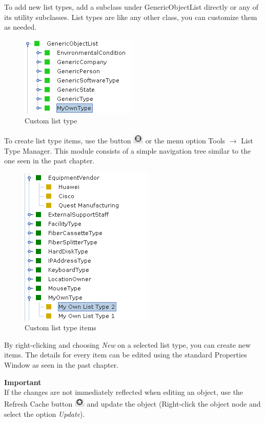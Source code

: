 \documentclass[a4paper]{article}
\begin{document}
	To add new list types, add a subclass under GenericObjectList directly or any of its utility subclasses. List types are like any other class, you can customize them as needed.
	\begin{figure}[h!]
		\centering
		\includegraphics[width=0.3\linewidth]{img/list_type_own_type.png}
		\caption{Custom list type}
		\label{fig:list_type_own_type}
	\end{figure}
	 To create list type items, use the button \includegraphics[width=0.5cm]{img/icon_list_type_manager.png} or the menu option Tools $\rightarrow$ List Type Manager. This module consists of a simple navigation tree similar to the one seen in the past chapter.
	 \begin{figure}[h!]
	 	\centering
	 	\includegraphics[width=0.3\linewidth]{img/list_type_list_type_items.png}
	 	\caption{Custom list type items}
	 	\label{fig:list_type_list_type_items}
	 \end{figure}
	 
	 By right-clicking and choosing \textit{New} on a selected list type, you can create new items. The details for every item can be edited using the standard Properties Window as seen in the past chapter. 
	 \newpage
	 \begin{framed} {\large \textbf{Important}}\\
	 	If the changes are not immediately reflected when editing an object, use the Refresh Cache button  \includegraphics[width=0.5cm]{img/icon_refresh_cache.png} and update the object (Right-click the object node and select the option \textit{Update}).
	 \end{framed}
	 
\end{document}
